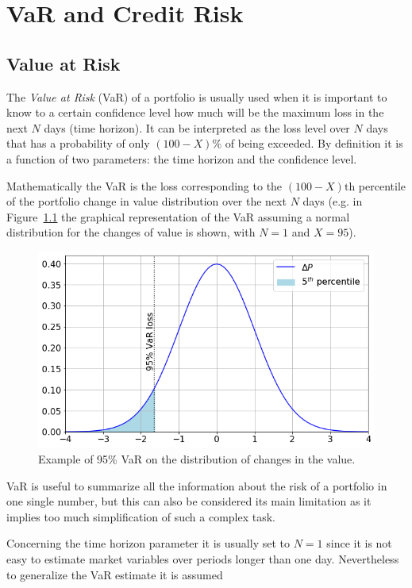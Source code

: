 \chapter{VaR and Credit Risk}
\label{var-and-credit-risk}

\section{Value at Risk}
\label{value-at-risk}

The \emph{Value at Risk} (VaR) of a portfolio is usually used when it is important to know to a certain confidence level how much will be the maximum loss in the next $N$ days (time horizon). It can be interpreted as the loss level over $N$ days that has a probability of only \((100 - X)\%\) of being exceeded. By definition it is a function of two parameters: the time horizon and the confidence level. 

Mathematically the VaR is the loss corresponding to the \((100-X)\textrm{th}\) percentile of the portfolio change in value distribution over the next $N$ days (e.g. in Figure~\ref{fig:var_loss} the graphical representation of the VaR assuming a normal distribution for the changes of value is shown, with $N=1$ and $X=95$).

\begin{figure}[htb]
\centering
  \includegraphics[width=0.6\linewidth]{figures/95_var.png}
  \caption{Example of 95\% VaR on the distribution of changes in the value.}
  \label{fig:var_loss}
\end{figure}
    
VaR is useful to summarize all the information about the risk of a portfolio in one single number, but this can also be considered its main limitation as it implies too much simplification of such a complex task.

Concerning the time horizon parameter it is usually set to $N=1$ since it is not easy to estimate market variables over periods longer than one day. Nevertheless to generalize the VaR estimate it is assumed

